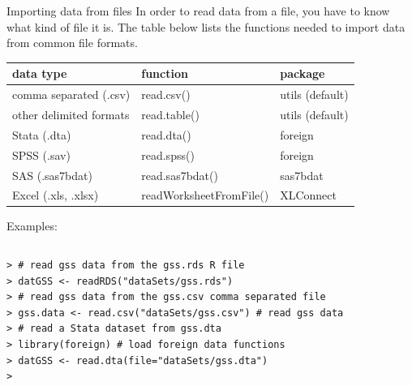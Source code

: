 \documentclass[table,smaller]{beamer}
\begin{document}
\begin{frame}[fragile,label=sec-5-3]{Importing data from files}
 In order to read data from a file, you have to know what kind of file it is. The table below lists the functions needed to import data from common file formats.

\begin{center}
\begin{tabular}{lll}
data type & function & package\\
\hline
comma separated (.csv) & read.csv() & utils (default)\\
other delimited formats & read.table() & utils (default)\\
Stata (.dta) & read.dta() & foreign\\
SPSS (.sav) & read.spss() & foreign\\
SAS (.sas7bdat) & read.sas7bdat() & sas7bdat\\
Excel (.xls, .xlsx) & readWorksheetFromFile() & XLConnect\\
\hline
\end{tabular}
\end{center}

Examples:
\vspace{-.5em}
\begin{columns}
\begin{block}{}
\begin{verbatim}
> # read gss data from the gss.rds R file
> datGSS <- readRDS("dataSets/gss.rds")
> # read gss data from the gss.csv comma separated file
> gss.data <- read.csv("dataSets/gss.csv") # read gss data
> # read a Stata dataset from gss.dta 
> library(foreign) # load foreign data functions
> datGSS <- read.dta(file="dataSets/gss.dta")
>
\end{verbatim}
\end{block}
\end{columns}
\vspace{.5em}
\end{frame}
\end{document}
